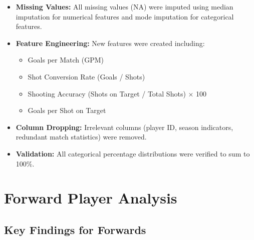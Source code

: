 \documentclass[12pt,a4paper]{article}
\begin{document}
\begin{itemize}[leftmargin=1.2cm, label=\textcolor{primary}{\faCheckCircle}]
    \item \textbf{Missing Values:} All missing values (NA) were imputed using median imputation for numerical features and mode imputation for categorical features.
    \item \textbf{Feature Engineering:} New features were created including:
        \begin{itemize}
            \item Goals per Match (GPM)
            \item Shot Conversion Rate (Goals / Shots)
            \item Shooting Accuracy (Shots on Target / Total Shots) × 100
            \item Goals per Shot on Target
        \end{itemize}
    \item \textbf{Column Dropping:} Irrelevant columns (player ID, season indicators, redundant match statistics) were removed.
    \item \textbf{Validation:} All categorical percentage distributions were verified to sum to 100\%.
\end{itemize}
\newpage
\section{Forward Player Analysis}

\subsection{Key Findings for Forwards}
\end{document}
